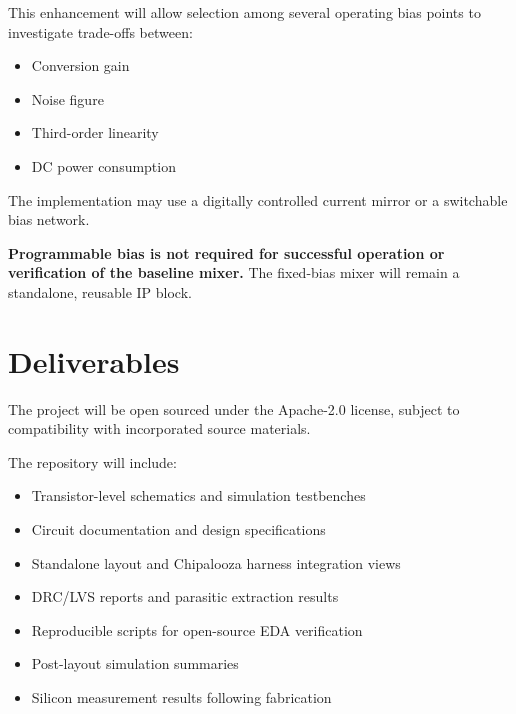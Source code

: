 \documentclass[11pt,letterpaper]{article}
\begin{document}
\begin{samepage}
This enhancement will allow selection among several
operating bias points to investigate trade-offs between:

\begin{itemize}
    \item Conversion gain
    \item Noise figure
    \item Third-order linearity
    \item DC power consumption
\end{itemize}
\end{samepage}

The implementation may use a digitally controlled
current mirror or a switchable bias network.

\textbf{Programmable bias is not required for successful
operation or verification of the baseline mixer.}
The fixed-bias mixer will remain a standalone,
reusable IP block.


\section{Deliverables}

The project will be open sourced under the Apache-2.0 license, subject to compatibility with incorporated source materials.

The repository will include:

\begin{itemize}
    \item Transistor-level schematics and simulation
    testbenches

    \item Circuit documentation and design
    specifications

    \item Standalone layout and Chipalooza harness
    integration views

    \item DRC/LVS reports and parasitic extraction
    results

    \item Reproducible scripts for open-source
    EDA verification

    \item Post-layout simulation summaries

    \item Silicon measurement results following
    fabrication
\end{itemize}
\end{document}
